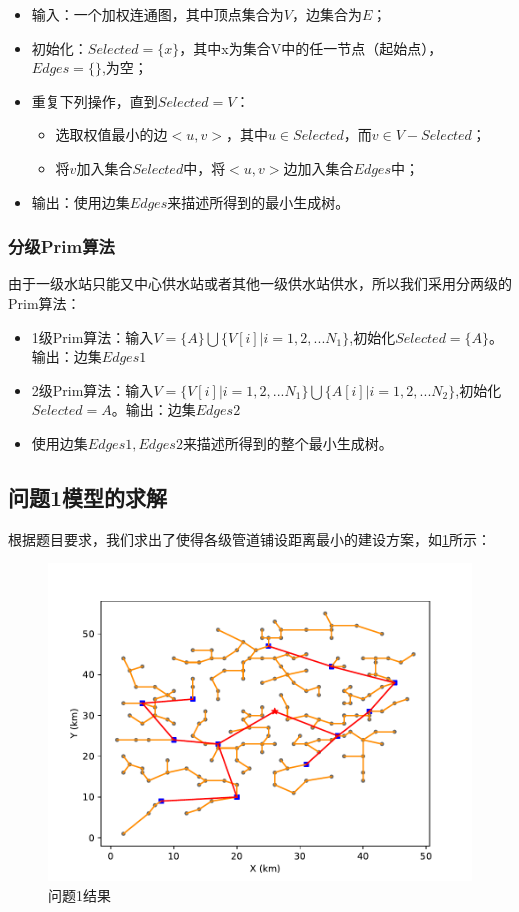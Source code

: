 \documentclass{cumcmthesis}
\begin{document}
\begin{itemize}
  \item 输入：一个加权连通图，其中顶点集合为$V$，边集合为$E$；

  \item 初始化：$Selected = \{x\}$，其中x为集合V中的任一节点（起始点），$Edges = \{\}$,为空；
  
  \item 重复下列操作，直到$Selected = V$：
  \begin{itemize}
    \item 选取权值最小的边$<u, v>$，其中$u \in Selected$，而$v \in V-Selected$；
  
    \item 将$v$加入集合$Selected$中，将$<u, v>$边加入集合$Edges$中；
  \end{itemize}
  \item 输出：使用边集$Edges$来描述所得到的最小生成树。
\end{itemize}

\subsubsection{分级Prim算法}
由于一级水站只能又中心供水站或者其他一级供水站供水，所以我们采用分两级的Prim算法：
\begin{itemize}
  \item 1级Prim算法：输入$V = \{A\}\bigcup \{ V[i]|i=1,2,...N_1\}$,初始化$Selected = \{A\}$。
  输出：边集$Edges1$

  \item 2级Prim算法：输入$V = \{V[i]|i=1,2,...N_1\} \bigcup \{A[i]|i=1,2,...N_2\}$,初始化$Selected = {A}$。输出：边集$Edges2$
  \item 使用边集$Edges1, Edges2$来描述所得到的整个最小生成树。
\end{itemize}
\subsection{问题1模型的求解}
  根据题目要求，我们求出了使得各级管道铺设距离最小的建设方案，如\cref{fig:solution1}所示：
  \begin{figure}[!h]
    \centering
    \includegraphics[width=.9\textwidth]{figure/pipeline.pdf}
    \caption{问题1结果}
    \label{fig:solution1}
  \end{figure}
\end{document}
